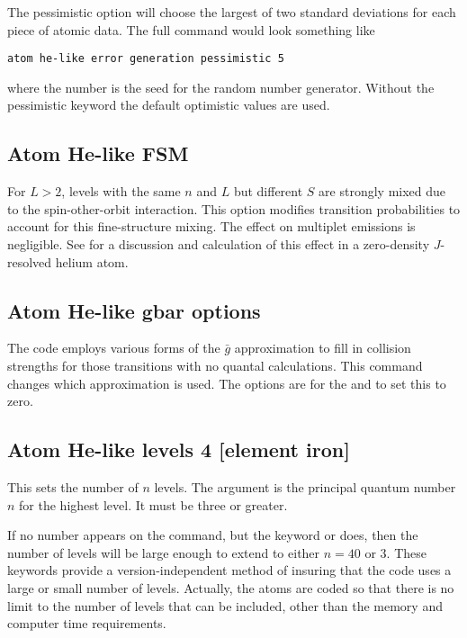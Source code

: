 The pessimistic option will choose the largest of two standard deviations
for each piece of atomic data.
The full command would look something like
\begin{verbatim}
atom he-like error generation pessimistic 5
\end{verbatim}
where the number is the seed for the random number generator. Without the
pessimistic keyword the default optimistic values are used.

\subsection{Atom He-like FSM}

For $L > 2$, levels with the same $n$ and $L$ but different $S$
are strongly
mixed due to the spin-other-orbit interaction.
This option modifies
transition probabilities to account for this fine-structure mixing.
The
effect on multiplet emissions is negligible.
See \citet{Bauman2005} for
a discussion and calculation of this effect in a zero-density $J$-resolved
helium atom.

\subsection{Atom He-like gbar options}

The code employs various forms of the $\bar g$
approximation to fill in collision strengths for those transitions with
no quantal calculations.
This command changes which approximation is used.
The options are  for the \citet{Vriens1980} and
 to set this to zero.

\subsection{Atom He-like levels 4 [element iron]}

This sets the number of $n$ levels.
The argument is the principal quantum
number $n$ for the highest level.
It must be three or greater.

If no number appears on the command, but the keyword  or
 does,
then the number of levels will be large enough to extend
to either $n = 40$ or 3.
These keywords provide a version-independent method of insuring that
the code uses a large or small number of levels.
Actually, the atoms are
coded so that there is no limit to the number of levels that
can be included, other than the memory and computer time requirements.

